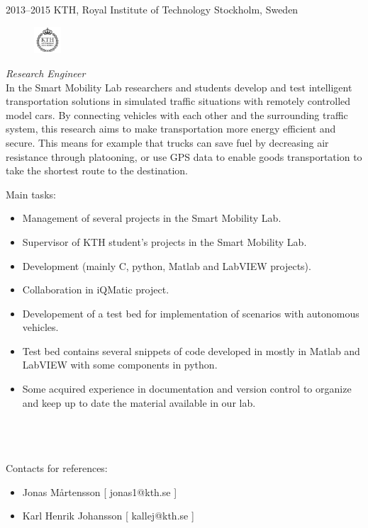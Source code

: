 \documentclass[]{friggeri-cv} %
\begin{document}
\begin{entrylist}
\entry
{2013--2015}
{KTH, Royal Institute of Technology}
{Stockholm, Sweden}
{
\begin{figure}
	\vspace{-20pt}
	\begin{center}
		\includegraphics[width=1cm,height=1cm]{kth}
	\end{center}
\end{figure}
\emph{Research Engineer} \\

In the Smart Mobility Lab researchers and students develop and test intelligent transportation solutions in simulated traffic situations with remotely controlled model cars. By connecting vehicles with each other and the surrounding traffic system, this research aims to make transportation more energy efficient and secure. This means for example that trucks can save fuel by decreasing air resistance through platooning, or use GPS data to enable goods transportation to take the shortest route to the destination.

Main tasks:
\begin{itemize}
	\item Management of several projects in the Smart Mobility Lab.
	\item Supervisor of KTH student's projects in the Smart Mobility Lab.
	\item Development (mainly C, python, Matlab and LabVIEW projects).
	\item Collaboration in iQMatic project.
	\item Developement of a test bed for implementation of scenarios with autonomous vehicles.
	\item Test bed contains several snippets of code developed in mostly in Matlab and LabVIEW with some components in python.
	\item Some acquired experience in documentation and version control to organize and keep up to date the material available in our lab.
\end{itemize}
\\ \\
\\Contacts for references: 
\begin{itemize}
	\item Jonas Mårtensson [ jonas1@kth.se ]
	\item Karl Henrik Johansson [ kallej@kth.se ]
\end{itemize}
\\
}
\end{entrylist}
\end{document}
